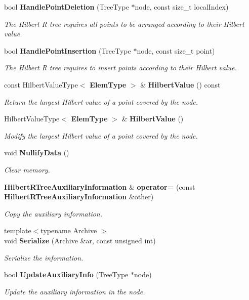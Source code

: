 \begin{DoxyCompactItemize}
bool {\bf Handle\+Point\+Deletion} (Tree\+Type $\ast$node, const size\+\_\+t local\+Index)
\begin{DoxyCompactList}\small\item\em The Hilbert R tree requires all points to be arranged according to their Hilbert value. \end{DoxyCompactList}\item 
bool {\bf Handle\+Point\+Insertion} (Tree\+Type $\ast$node, const size\+\_\+t point)
\begin{DoxyCompactList}\small\item\em The Hilbert R tree requires to insert points according to their Hilbert value. \end{DoxyCompactList}\item 
const Hilbert\+Value\+Type$<$ {\bf Elem\+Type} $>$ \& {\bf Hilbert\+Value} () const 
\begin{DoxyCompactList}\small\item\em Return the largest Hilbert value of a point covered by the node. \end{DoxyCompactList}\item 
Hilbert\+Value\+Type$<$ {\bf Elem\+Type} $>$ \& {\bf Hilbert\+Value} ()
\begin{DoxyCompactList}\small\item\em Modify the largest Hilbert value of a point covered by the node. \end{DoxyCompactList}\item 
void {\bf Nullify\+Data} ()
\begin{DoxyCompactList}\small\item\em Clear memory. \end{DoxyCompactList}\item 
{\bf Hilbert\+R\+Tree\+Auxiliary\+Information} \& {\bf operator=} (const {\bf Hilbert\+R\+Tree\+Auxiliary\+Information} \&other)
\begin{DoxyCompactList}\small\item\em Copy the auxiliary information. \end{DoxyCompactList}\item 
{\footnotesize template$<$typename Archive $>$ }\\void {\bf Serialize} (Archive \&ar, const unsigned int)
\begin{DoxyCompactList}\small\item\em Serialize the information. \end{DoxyCompactList}\item 
bool {\bf Update\+Auxiliary\+Info} (Tree\+Type $\ast$node)
\begin{DoxyCompactList}\small\item\em Update the auxiliary information in the node. \end{DoxyCompactList}\end{DoxyCompactItemize}
